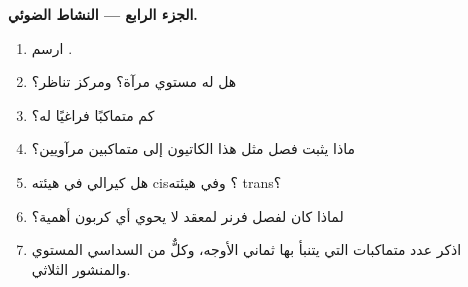 \begin{problem}
\medskip
\noindent\textbf{الجزء الرابع --- النشاط الضوئي.}
\begin{enumerate}[resume]
  \item ارسم .
  \item هل له مستوي مرآة؟ ومركز تناظر؟
  \item كم متماكبًا فراغيًا له؟
  \item ماذا يثبت فصل مثل هذا الكاتيون إلى متماكبين مرآويين؟
  \item هل \ce{[CoCl2(en)2]+} كيرالي في هيئته cis؟ وفي هيئته trans؟
  \item لماذا كان لفصل فرنر لمعقد لا يحوي أي كربون أهمية؟
  \item اذكر عدد متماكبات \ce{[CoCl2(NH3)4]+} التي يتنبأ بها ثماني الأوجه،
        وكلٌّ من السداسي المستوي والمنشور الثلاثي.
\end{enumerate}
\end{problem}
